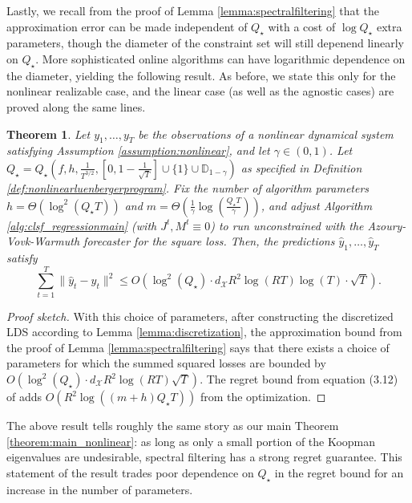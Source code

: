 \documentclass[11pt]{article}
\newtheorem{theorem}{Theorem}[section]
\numberwithin{equation}{section}
\begin{document}
Lastly, we recall from the proof of Lemma \ref{lemma:spectralfiltering} that the approximation error can be made independent of $Q_\star$ with a cost of $\log Q_\star$ extra parameters, though the diameter of the constraint set will still depenend linearly on $Q_\star$. More sophisticated online algorithms can have logarithmic dependence on the diameter, yielding the following result. As before, we state this only for the nonlinear realizable case, and the linear case (as well as the agnostic cases) are proved along the same lines.

\begin{theorem}
    \label{theorem:logdependence}
    Let $y_1, \ldots, y_T$ be the observations of a nonlinear dynamical system satisfying Assumption \ref{assumption:nonlinear}, and let $\gamma \in (0, 1)$. 
    Let $Q_\star = Q_\star\left(f,h,\frac{1}{T^{3/2}}, \left[0, 1 - \frac{1}{\sqrt{T}}\right] \cup \{1\} \cup \mathbb{D}_{1-\gamma}\right)$ as specified in Definition \ref{def:nonlinearluenbergerprogram}. Fix the number of algorithm parameters $h = \Theta\left(\log^2(Q_\star T)\right)$ and $m = \Theta\left(\frac{1}{\gamma} \log\left(\frac{Q_\star T}{\gamma}\right)\right)$, and adjust Algorithm \ref{alg:clsf_regressionmain} (with $J^t,M^t \equiv 0$) to run unconstrained with the Azoury-Vovk-Warmuth forecaster for the square loss. Then, the predictions $\hat{y}_1, \ldots, \hat{y}_T$ satisfy
    $$\sum_{t=1}^T \|\hat{y}_t - y_t\|^2 \leq O\left(\log^2(Q_\star) \cdot d_\mathcal{X}R^2 \log(RT) \log(T)\cdot \sqrt{T}\right).$$
    
\end{theorem}
\begin{proof}[Proof sketch]
With this choice of parameters, after constructing the discretized LDS according to Lemma \ref{lemma:discretization}, the approximation bound from the proof of Lemma \ref{lemma:spectralfiltering} says that there exists a choice of parameters for which the summed squared losses are bounded by $O\left(\log^2(Q_\star) \cdot d_\mathcal{X} R^2 \log(RT) \sqrt{T}\right)$. The regret bound from equation (3.12) of \cite{azoury2001relative} adds $O\left(R^2 \log((m+h)Q_\star T)\right)$ from the optimization.
\end{proof}
The above result tells roughly the same story as our main Theorem \ref{theorem:main_nonlinear}: as long as only a small portion of the Koopman eigenvalues are undesirable, spectral filtering has a strong regret guarantee. This statement of the result trades poor dependence on $Q_\star$ in the regret bound for an increase in the number of parameters.
\end{document}
